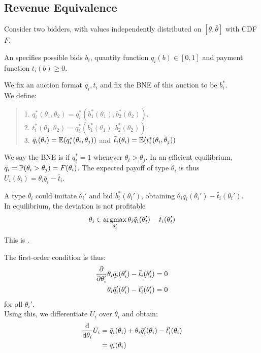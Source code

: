 \subsection{Revenue Equivalence}
Consider two bidders, with values independently distributed on $[\underline{\theta}, \bar{\theta}]$ with CDF $F$. 
\begin{definition}
    An  specifies possible bids $b_i$, quantity function $q_i(b) \in [0, 1]$ and payment function $t_i(b) \ge 0$.
\end{definition}
We fix an auction format $q_i, t_i$ and fix the BNE of this auction to be $b_i^*$. \\
We define:
\begin{quote}
    1. $q_i^*(\theta_1, \theta_2) = q_i^*(b_1^*(\theta_1), b_2^*(\theta_2))$. \\
    2. $t_i^*(\theta_1, \theta_2) = q_i^*(b_1^*(\theta_1), b_2^*(\theta_2))$. \\
    3. $\bar{q}_i(\theta_i) = \mathbb{E}(q_i^*(\theta_i, \tilde{\theta}_j))$ and $\bar{t}_i(\theta_i) = \mathbb{E}(t_i^*(\theta_i, \tilde{\theta}_j))$
\end{quote}
We say the BNE is  if $q_i^* = 1$ whenever $\theta_i > \theta_j$. In an efficient equilibrium, $\bar{q}_i = \mathbb{P}(\theta_i > \tilde{\theta}_j) = F(\theta_i)$. The expected payoff of type $\theta_i$ is thus $U_i(\theta_i) = \theta_i \bar{q}_i - \bar{t}_i$.
\begin{definition}
    A type $\theta_i$ could imitate $\theta_i'$ and bid $b_i^*(\theta_i')$, obtaining $\theta_i \bar{q}_i(\theta_i') - \bar{t}_i(\theta_i')$. \\
    In equilibrium, the deviation is not profitable
    $$\theta_i \in \operatorname*{argmax}_{\theta_i'}\theta_i \bar{q}_i(\theta_i') - \bar{t}_i(\theta_i')$$
    This is .
\end{definition}
The first-order condition is thus:
\begin{align*}
    \pdv{\theta_i'} \theta_i \bar{q}_i(\theta_i') - \bar{t}_i(\theta_i') &= 0 \\
    \theta_i \bar{q}_i'(\theta_i') - \bar{t}_i'(\theta_i') &= 0
\end{align*}
for all $\theta_i'$. \\
Using this, we differentiate $U_i$ over $\theta_i$ and obtain:
\begin{align*}
    \dv{\theta_i} U_i &= \bar{q}_i(\theta_i) + \theta_i \bar{q}_i'(\theta_i) - \bar{t}_i'(\theta_i) \\
    &= \bar{q}_i(\theta_i)
\end{align*}

